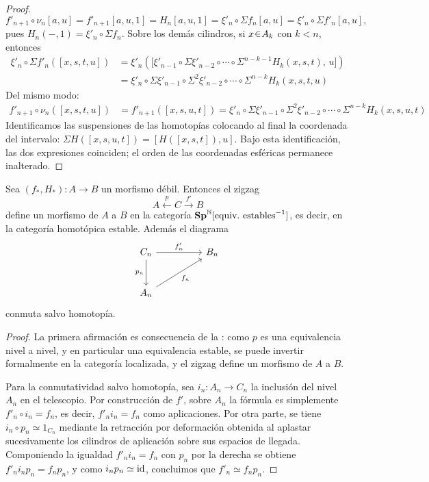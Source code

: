 \begin{proof}
\[
f'_{n+1}\circ\nu_n[a,u]
=f'_{n+1}[a,u,1]
=H_n[a,u,1]
=\xi'_n\circ\Sigma f_n[a,u]
=\xi'_n\circ\Sigma f'_n[a,u],
\]
pues $H_n(-,1)=\xi'_n\circ\Sigma f_n$. Sobre los demás cilindros, si $x\en A_k$ con $k<n$, entonces
\begin{align*}
\xi'_n\circ\Sigma f'_n([x,s,t,u])
&= \xi'_n\left(\bigl[\xi'_{n-1}\circ\Sigma\xi'_{n-2}\circ\cdots\circ\Sigma^{n-k-1}H_{k}(x,s,t),\,u\bigr]\right)\\
&= \xi'_n\circ\Sigma\xi'_{n-1}\circ\Sigma^2\xi'_{n-2}\circ\cdots\circ\Sigma^{n-k}H_{k}(x,s,t,u)
\end{align*}
Del mismo modo:
\begin{align*}
f'_{n+1} \circ \nu_n([x,s,t,u])
&= f'_{n+1}([x,s,u,t])
=\xi'_n\circ\Sigma\xi'_{n-1}\circ\Sigma^2\xi'_{n-2}\circ\cdots\circ\Sigma^{n-k}H_{k}(x,s,u,t)
\end{align*}
Identificamos las suspensiones de las homotopías colocando al final la coordenada del intervalo: $\Sigma H([x,s,u,t])=[H([x,s,t]),u]$. Bajo esta identificación, las dos expresiones coinciden; el orden de las coordenadas esféricas permanece inalterado.
\end{proof}

\begin{teo}\label{teo:zigzag-morfismo-debil}
Sea $(f_*,H_*)\colon A\to B$ un morfismo débil. Entonces el zigzag
\[
A\xleftarrow{\ p\ }C\xrightarrow{\ f'\ }B
\]
define un morfismo de $A$ a $B$ en la categoría $\Sp^{\mathbb{N}}[\text{equiv.\ estables}^{-1}]$, es decir, en la categoría homotópica estable. Además el diagrama
\[
\begin{tikzcd}[column sep=huge, row sep=large]
C_n \arrow[r,"f'_n"] \arrow[d,"p_n"'] & B_n\\
A_n \arrow[ru,"f_n"'] &
\end{tikzcd}
\]
conmuta salvo homotopía.
\end{teo}

\begin{proof}
La primera afirmación es consecuencia de la : como $p$ es una equivalencia nivel a nivel, y en particular una equivalencia estable, se puede invertir formalmente en la categoría localizada, y el zigzag define un morfismo de $A$ a $B$.

Para la conmutatividad salvo homotopía, sea $i_n\colon A_n\to C_n$ la inclusión del nivel $A_n$ en el telescopio. Por construcción de $f'$, sobre $A_n$ la fórmula es simplemente $f'_n\circ i_n=f_n$, es decir, $f'_n i_n=f_n$ como aplicaciones. Por otra parte, se tiene $i_n\circ p_n\simeq1_{C_n}$ mediante la retracción por deformación obtenida al aplastar sucesivamente los cilindros de aplicación sobre sus espacios de llegada. Componiendo la igualdad $f'_ni_n=f_n$ con $p_n$ por la derecha se obtiene $f'_n i_n p_n=f_n p_n$,
y como $i_np_n\simeq\operatorname{id}$, concluimos que $f'_n\simeq f_np_n$.
\end{proof}

